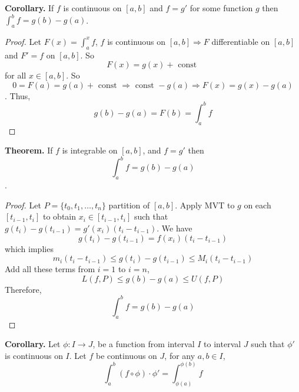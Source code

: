 \documentclass[10pt,letterpaper]{article}
\begin{document}
	\textbf{Corollary. } If $f$ is continuous on $[a, b]$ and $f = g'$ for some function
	$g$ then 
	$\displaystyle\int_{a}^{b} f = g(b) - g(a)$.
	\begin{proof}
		Let $F(x) = \displaystyle\int_{a}^{x} f$, $f$ is continuous on $[a, b] \Rightarrow 
		F$ differentiable on $[a, b]$ and $F' = f$ on $[a, b]$. So
		$$F(x) = g(x) + \text{ const }$$
		for all $x \in [a, b]$. So
		$$0 = F(a) = g(a) + \text{ const } \Rightarrow \text{ const } -g(a) \Rightarrow
		F(x) = g(x) - g(a)$$.
		Thus,
		$$g(b) - g(a) = F(b) = \displaystyle\int_{a}^{b} f$$	
	\end{proof}

	\textbf{Theorem. } If $f$ is integrable on $[a, b]$, and $f = g'$ then
	$$\displaystyle\int_{a}^{b} f = g(b) - g(a)$$.	
	\begin{proof}
	Let $P = \{t_0, t_1, \ldots, t_n\}$ partition of $[a, b]$. Apply MVT to $g$ on each
	$[t_{i-1}, t_i]$ to obtain $x_i \in [t_{i-1}, t_i]$ such that 
	$g(t_{i}) - g(t_{i-1}) = g'(x_i)(t_i - t_{i-1})$. 
	We have
	$$g(t_i) - g(t_{i-1}) = f(x_i)(t_i - t_{i-1})$$
	which implies
	$$m_i(t_i - t_{i-1}) \leq g(t_i) - g(t_{i-1}) \leq M_i(t_i - t_{i-1})$$
	Add all these terms from $i = 1$ to $i = n$,
	$$L(f, P) \leq g(b) - g(a) \leq U(f, P)$$
	Therefore,
	$$\displaystyle\int_{a}^{b} f = g(b) - g(a)$$
	\end{proof}

	\textbf{Corollary. } Let $\phi : I \rightarrow J$, be a function from interval $I$ to interval $J$ 
	such that $\phi'$ is continuous on $I$. Let $f$ be continuous on $J$, for any $a, b \in I$,
	$$\displaystyle\int_{a}^{b} (f \circ \phi) \cdot \phi' = 
	\displaystyle\int_{\phi(a)}^{\phi(b)} f$$
\end{document}
